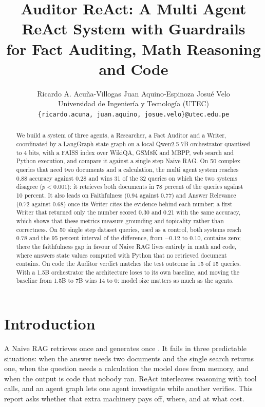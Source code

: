 \documentclass{article}
\title{Auditor ReAct: A Multi Agent ReAct System with Guardrails\\ for Fact Auditing, Math Reasoning and Code}
\author{%
  Ricardo A. Acu\~na-Villogas \quad Juan Aquino-Espinoza \quad Josu\'e Velo \\
  Universidad de Ingenier\'ia y Tecnolog\'ia (UTEC) \\
  \texttt{\{ricardo.acuna, juan.aquino, josue.velo\}@utec.edu.pe}
}
\begin{document}
\maketitle

\begin{abstract}
We build a system of three agents, a Researcher, a Fact Auditor and a Writer, coordinated by a LangGraph state graph on a local Qwen2.5 7B orchestrator quantised to 4 bits, with a FAISS index over WikiQA, GSM8K and MBPP, web search and Python execution, and compare it against a single step Naive RAG. On 50 complex queries that need two documents and a calculation, the multi agent system reaches 0.88 accuracy against 0.28 and wins 31 of the 32 queries on which the two systems disagree ($p < 0.001$): it retrieves both documents in 78 percent of the queries against 10 percent. It also leads on Faithfulness (0.94 against 0.77) and Answer Relevance (0.72 against 0.68) once its Writer cites the evidence behind each number; a first Writer that returned only the number scored 0.30 and 0.21 with the same accuracy, which shows that these metrics measure grounding and topicality rather than correctness.
On 50 single step dataset queries, used as a control, both systems reach 0.78 and the 95 percent interval of the difference, from $-0.12$ to $0.10$, contains zero; there the faithfulness gap in favour of Naive RAG lives entirely in math and code, where answers state values computed with Python that no retrieved document contains. On code the Auditor verdict matches the test outcome in 15 of 15 queries. With a 1.5B orchestrator the architecture loses to its own baseline, and moving the baseline from 1.5B to 7B wins 14 to 0: model size matters as much as the agents.
\end{abstract}

\section{Introduction}

\noindent A Naive RAG retrieves once and generates once \citep{lewis2020rag}. It fails in three predictable situations: when the answer needs two documents and the single search returns one, when the question needs a calculation the model does from memory, and when the output is code that nobody ran. ReAct \citep{yao2023react} interleaves reasoning with tool calls, and an agent graph lets one agent investigate while another verifies. This report asks whether that extra machinery pays off, where, and at what cost.
\end{document}
